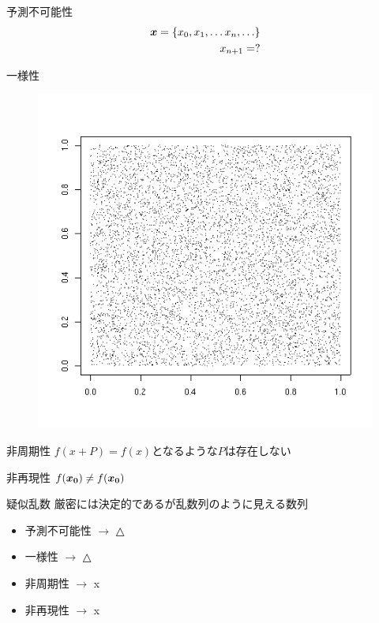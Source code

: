 \documentclass[a4j,dvipdfmx,xcolor={svgnames},19pt]{beamer}
\def\vector#1{\mbox{\boldmath $#1$}}
\begin{document}
  \begin{frame}{予測不可能性}
      \begin{align}
        \vector{x} = \{x_0,x_1,\ldots x_n, \ldots\} \\
        x_{n+1} = ?
      \end{align}
    \end{frame}

    \begin{frame}{一様性}
      \begin{figure}[htbp]
        \includegraphics[scale=0.5]{MTrand.png}
      \end{figure}
    \end{frame}

    \begin{frame}{非周期性}
      $f(x + P) = f(x)$となるような$P$は存在しない
    \end{frame}

    \begin{frame}{非再現性}
      $f(\vector{x_0}) \ne f(\vector{x_0})$
    \end{frame}

    \begin{frame}{疑似乱数}
      厳密には決定的であるが乱数列のように見える数列
      \begin{itemize}
        \item 予測不可能性 $\rightarrow$ △
        \item 一様性 $\rightarrow$ △
        \item 非周期性 $\rightarrow$ x
        \item 非再現性 $\rightarrow$ x
      \end{itemize}
    \end{frame}
\end{document}
